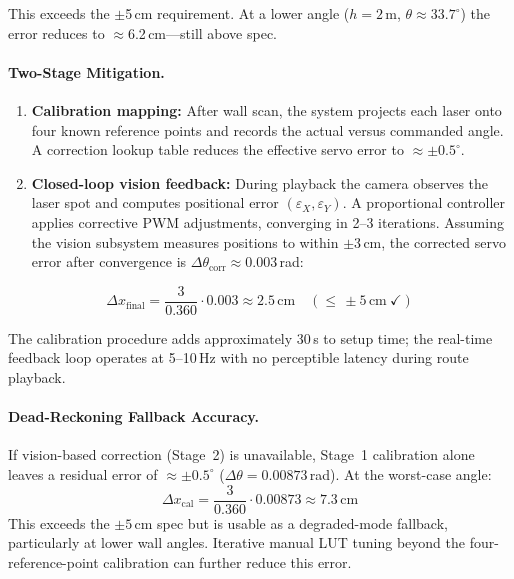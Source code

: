 \documentclass[12pt]{extarticle}
\begin{document}
This exceeds the $\pm$5\,cm requirement. At a lower angle ($h = 2$\,m, $\theta \approx
33.7^\circ$) the error reduces to $\approx$6.2\,cm---still above spec.

\paragraph{Two-Stage Mitigation.}
\begin{enumerate}
    \item \textbf{Calibration mapping:} After wall scan, the system projects each laser onto
    four known reference points and records the actual versus commanded angle. A correction
    lookup table reduces the effective servo error to $\approx\pm0.5^\circ$.

    \item \textbf{Closed-loop vision feedback:} During playback the camera observes the laser
    spot and computes positional error $(\varepsilon_X, \varepsilon_Y)$. A proportional
    controller applies corrective PWM adjustments, converging in 2--3 iterations. Assuming the
    vision subsystem measures positions to within $\pm$3\,cm, the corrected servo error after
    convergence is $\Delta\theta_{\text{corr}} \approx 0.003$\,rad:
\end{enumerate}

\begin{equation}
    \Delta x_{\text{final}} = \frac{3}{0.360} \cdot 0.003 \approx 2.5\,\text{cm} \quad
    (\leq\, \pm5\,\text{cm}\ \checkmark)
\end{equation}

The calibration procedure adds approximately 30\,s to setup time; the real-time feedback loop
operates at 5--10\,Hz with no perceptible latency during route playback.

\paragraph{Dead-Reckoning Fallback Accuracy.}
If vision-based correction (Stage~2) is unavailable, Stage~1 calibration alone leaves a
residual error of $\approx\pm0.5^\circ$ ($\Delta\theta = 0.00873$\,rad). At the worst-case
angle:
\begin{equation}
    \Delta x_{\text{cal}} = \frac{3}{0.360} \cdot 0.00873 \approx 7.3\,\text{cm}
\end{equation}
This exceeds the $\pm5$\,cm spec but is usable as a degraded-mode fallback, particularly at
lower wall angles. Iterative manual LUT tuning beyond the four-reference-point calibration
can further reduce this error.
\end{document}
